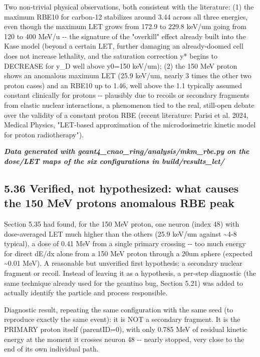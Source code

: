 \documentclass[
  english,
]{article}
\begin{document}
Two non-trivial physical observations, both consistent with the literature: (1) the maximum RBE10 for carbon-12 stabilizes around 3.44 across all three energies, even though the maximum LET grows from 172.9 to 229.8 keV/um going from 120 to 400 MeV/u -\/- the signature of the "overkill" effect already built into the Kase model (beyond a certain LET, further damaging an already-doomed cell does not increase lethality, and the saturation correction y* begins to DECREASE for y\_\allowbreak{}D well above y0=150 keV/um); (2) the 150 MeV proton shows an anomalous maximum LET (25.9 keV/um, nearly 3 times the other two proton cases) and an RBE10 up to 1.46, well above the 1.1 typically assumed constant clinically for protons -\/- plausibly due to recoils or secondary fragments from elastic nuclear interactions, a phenomenon tied to the real, still-open debate over the validity of a constant proton RBE (recent literature: Parisi et al. 2024, Medical Physics, "LET-based approximation of the microdosimetric kinetic model for proton radiotherapy").

\emph{\textbf{Data generated with geant4\_\allowbreak{}cnao\_\allowbreak{}ring/analysis/mkm\_\allowbreak{}rbe.py on the dose/LET maps of the six configurations in build/results\_\allowbreak{}let/}}

\subsection{5.36 Verified, not hypothesized: what causes the 150 MeV proton\textquotesingle s anomalous RBE peak}\label{verified-not-hypothesized-what-causes-the-150-mev-protons-anomalous-rbe-peak}

Section 5.35 had found, for the 150 MeV proton, one neuron (index 48) with dose-averaged LET much higher than the others (25.9 keV/um against \textasciitilde4-8 typical), a dose of 0.41 MeV from a single primary crossing -\/- too much energy for direct dE/dx alone from a 150 MeV proton through a 20um sphere (expected \textasciitilde0.01 MeV). A reasonable but unverified first hypothesis: a secondary nuclear fragment or recoil. Instead of leaving it as a hypothesis, a per-step diagnostic (the same technique already used for the geantino bug, Section 5.21) was added to actually identify the particle and process responsible.

Diagnostic result, repeating the same configuration with the same seed (to reproduce exactly the same event): it is NOT a secondary fragment. It is the PRIMARY proton itself (parentID=0), with only 0.785 MeV of residual kinetic energy at the moment it crosses neuron 48 -\/- nearly stopped, very close to the end of its own individual path.
\end{document}

